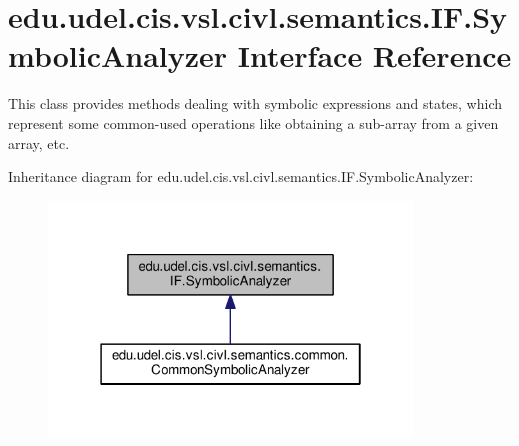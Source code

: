 \hypertarget{interfaceedu_1_1udel_1_1cis_1_1vsl_1_1civl_1_1semantics_1_1IF_1_1SymbolicAnalyzer}{}\section{edu.\+udel.\+cis.\+vsl.\+civl.\+semantics.\+I\+F.\+Symbolic\+Analyzer Interface Reference}
\label{interfaceedu_1_1udel_1_1cis_1_1vsl_1_1civl_1_1semantics_1_1IF_1_1SymbolicAnalyzer}


This class provides methods dealing with symbolic expressions and states, which represent some common-\/used operations like obtaining a sub-\/array from a given array, etc.  




Inheritance diagram for edu.\+udel.\+cis.\+vsl.\+civl.\+semantics.\+I\+F.\+Symbolic\+Analyzer\+:
\nopagebreak
\begin{figure}[H]
\begin{center}
\leavevmode
\includegraphics[width=274pt]{interfaceedu_1_1udel_1_1cis_1_1vsl_1_1civl_1_1semantics_1_1IF_1_1SymbolicAnalyzer__inherit__graph}
\end{center}
\end{figure}

